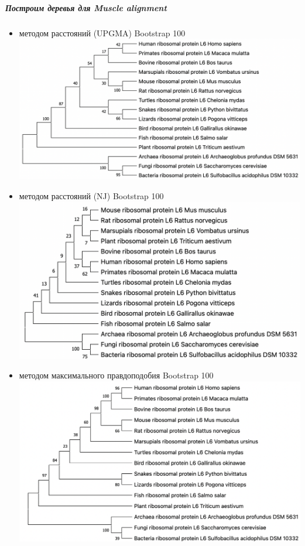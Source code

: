 \documentclass[12pt]{article}
\begin{document}
\subparagraph{Построим деревья для Muscle alignment}
\begin{itemize}
    \itemsep0em
    \item методом расстояний (UPGMA) Bootstrap 100\\
    \includegraphics[width=\textwidth]{images/image3.png}\\
    \item методом расстояний (NJ) Bootstrap 100\\
    \includegraphics[width=\textwidth]{images/image4.png}\\
    \newpage
    \item методом максимального правдоподобия Bootstrap 100\\
    \includegraphics[width=\textwidth]{images/image5.png}\\
\end{itemize}
\end{document}
